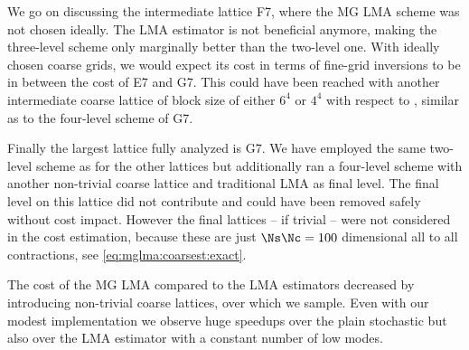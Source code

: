 We go on discussing the intermediate lattice F7, where the MG LMA scheme was not chosen ideally.
The LMA estimator is not beneficial anymore, making the three-level scheme only marginally better than the two-level one.
With ideally chosen coarse grids, we would expect its cost in terms of fine-grid inversions to be in between the cost of E7 and G7.
This could have been reached with another intermediate coarse lattice of block size of either $6^4$ or $4^4$ with respect to , similar as to the four-level scheme of G7.

Finally the largest lattice fully analyzed is G7.
We have employed the same two-level scheme as for the other lattices but additionally ran a four-level scheme with another non-trivial coarse lattice and traditional LMA as final level.
The final level on this lattice did not contribute and could have been removed safely without cost impact.
However the final lattices -- if trivial -- were not considered in the cost estimation, because these are just $\Ns \Nc=100$ dimensional all to all contractions, see \cref{eq:mglma:coarsest:exact}.

The cost of the MG LMA compared to the LMA estimators decreased by introducing non-trivial coarse lattices, over which we sample.
Even with our modest implementation we observe huge speedups over the plain stochastic but also over the LMA estimator with a constant number of low modes.

